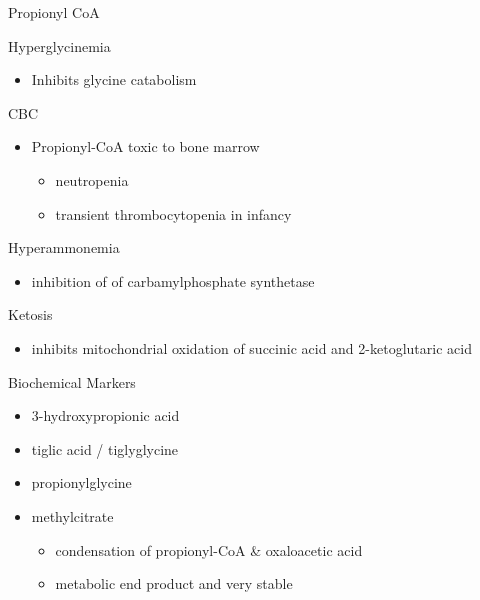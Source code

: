 \documentclass[presentation, smaller]{beamer}
\begin{document}
\begin{frame}[label={sec:orgheadline11}]{Propionyl CoA}
\begin{block}{Hyperglycinemia}
\begin{itemize}
\item Inhibits glycine catabolism
\end{itemize}
\end{block}
\begin{block}{CBC}
\begin{itemize}
\item Propionyl-CoA toxic to bone marrow
\begin{itemize}
\item neutropenia
\item transient thrombocytopenia in infancy
\end{itemize}
\end{itemize}
\end{block}
\begin{block}{Hyperammonemia}
\begin{itemize}
\item inhibition of of carbamylphosphate synthetase
\end{itemize}
\end{block}
\begin{block}{Ketosis}
\begin{itemize}
\item inhibits mitochondrial oxidation of succinic acid and 2-ketoglutaric acid
\end{itemize}
\end{block}
\end{frame}

\begin{frame}[label={sec:orgheadline12}]{Biochemical Markers}
\begin{itemize}
\item 3-hydroxypropionic acid
\item tiglic acid / tiglyglycine
\item propionylglycine
\item methylcitrate
\begin{itemize}
\item condensation of propionyl-CoA \& oxaloacetic acid
\item metabolic end product and very stable
\end{itemize}
\end{itemize}
\end{frame}
\end{document}
